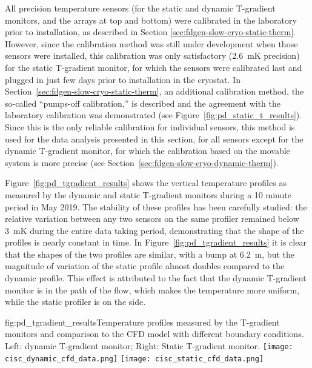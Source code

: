 All precision temperature sensors (for the static and dynamic T-gradient monitors,  and the \twod arrays at top and bottom) were calibrated in the laboratory prior to installation, as described in Section \ref{sec:fdgen-slow-cryo-static-therm}.
However, since the calibration method was still under development when those sensors 
were installed, this calibration was only satisfactory (\SI{2.6}{mK} precision) for the static T-gradient monitor, for which the sensors were calibrated last and  plugged in just few days prior to installation in the cryostat. 
In Section~\ref{sec:fdgen-slow-cryo-static-therm}, an additional calibration method, the so-called ``pumps-off calibration,'' is described and the agreement with the laboratory calibration was demonstrated %
(see Figure~\ref{fig:pd_static_t_results}). Since this is the only reliable calibration for individual sensors, this method is used for the data analysis presented in this section, for all sensors except for the dynamic T-gradient monitor, for which the calibration based on the movable system is more precise (see Section~\ref{sec:fdgen-slow-cryo-dynamic-therm}). 

Figure~\ref{fig:pd_tgradient_results} shows the vertical temperature profiles as measured by the dynamic and static T-gradient monitors during a 10 minute period in May 2019. The stability of these profiles has been carefully studied: the relative variation between any two sensors on the same profiler remained below \SI{3}{mK} during the entire data taking period, demonstrating that the shape of the profiles is nearly constant in time. In Figure~\ref{fig:pd_tgradient_results} it is clear  %
that the shapes of the two profiles are similar, with a bump at \SI{6.2}{m}, but the magnitude of %
variation of the static profile almost doubles %
compared to the dynamic profile. This effect is attributed to the fact that the dynamic T-gradient monitor is in the path of the \lar flow, which makes the temperature more uniform, while the static profiler is on the side. 


\begin{dunefigure}{fig:pd_tgradient_results}{Temperature profiles measured by the T-gradient monitors and comparison to the CFD model with different boundary conditions. Left: dynamic T-gradient monitor; Right: Static T-gradient monitor.}
  \texttt{[image: cisc\_dynamic\_cfd\_data.png]}%
  \texttt{[image: cisc\_static\_cfd\_data.png]}%
\end{dunefigure}

